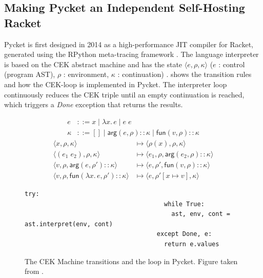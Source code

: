 \subsection{Making Pycket an Independent Self-Hosting Racket}
\label{subsec:pycket}

Pycket is first designed in 2014 as a high-performance JIT compiler
for Racket, generated using the RPython meta-tracing framework
\cite{bolz14-racket}. The language interpreter is based on the CEK
abstract machine and has the state $\langle e, \rho, \kappa \rangle$ ($e$ : control
(program AST), $\rho$ : environment, $\kappa$ : continuation)
\cite{felleisen87}.  shows the transition rules and
how the CEK-loop is implemented in Pycket. The interpreter loop
continuously reduces the CEK triple until an empty continuation is
reached, which triggers a \emph{Done} exception that returns the
results.

\begin{figure}[h!]
  \small
\begin{align*}
e &::= x \mid \lambda x.\, e \mid e \; e\\
\kappa &::= [] \mid \mathsf{arg}(e,\rho){::}\kappa \mid \mathsf{fun}(v,\rho){::}\kappa
\end{align*}
\begin{align*}
\langle x, \rho, \kappa \rangle & \longmapsto
    \langle \rho(x), \rho, \kappa \rangle \\
\langle (e_1 \; e_2), \rho, \kappa \rangle & \longmapsto
    \langle e_1, \rho, \mathsf{arg}(e_2, \rho){::}\kappa \rangle \\
\langle v, \rho, \mathsf{arg}(e,\rho'){::}\kappa \rangle & \longmapsto
    \langle e, \rho', \mathsf{fun}(v,\rho){::}\kappa \rangle \\
\langle v, \rho, \mathsf{fun}(\lambda x. \, e, \rho'){::}\kappa \rangle & \longmapsto
    \langle e, \rho'[x\mapsto v], \kappa \rangle
\end{align*}
\begin{lstlisting}[mathescape]
                                    try:
                                      while True:
                                        ast, env, cont = ast.interpret(env, cont)
                                    except Done, e:
                                      return e.values
\end{lstlisting}
\caption{The CEK Machine transitions and the loop in Pycket. Figure taken from \cite{pycket15}.}
\label{fig:cek}
\end{figure}


